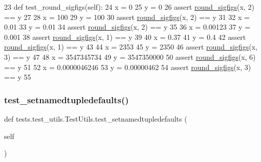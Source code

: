 \begin{DoxyCode}
23     \textcolor{keyword}{def }test\_round\_sigfigs(self):
24         x = 0
25         y = 0
26         \textcolor{keyword}{assert} \hyperlink{namespaceparlai_1_1agents_1_1legacy__agents_1_1seq2seq_1_1utils__v0_af377ec61bfc0423461e7b409ffc883b9}{round\_sigfigs}(x, 2) == y
27 
28         x = 100
29         y = 100
30         \textcolor{keyword}{assert} \hyperlink{namespaceparlai_1_1agents_1_1legacy__agents_1_1seq2seq_1_1utils__v0_af377ec61bfc0423461e7b409ffc883b9}{round\_sigfigs}(x, 2) == y
31 
32         x = 0.01
33         y = 0.01
34         \textcolor{keyword}{assert} \hyperlink{namespaceparlai_1_1agents_1_1legacy__agents_1_1seq2seq_1_1utils__v0_af377ec61bfc0423461e7b409ffc883b9}{round\_sigfigs}(x, 2) == y
35 
36         x = 0.00123
37         y = 0.001
38         \textcolor{keyword}{assert} \hyperlink{namespaceparlai_1_1agents_1_1legacy__agents_1_1seq2seq_1_1utils__v0_af377ec61bfc0423461e7b409ffc883b9}{round\_sigfigs}(x, 1) == y
39 
40         x = 0.37
41         y = 0.4
42         \textcolor{keyword}{assert} \hyperlink{namespaceparlai_1_1agents_1_1legacy__agents_1_1seq2seq_1_1utils__v0_af377ec61bfc0423461e7b409ffc883b9}{round\_sigfigs}(x, 1) == y
43 
44         x = 2353
45         y = 2350
46         \textcolor{keyword}{assert} \hyperlink{namespaceparlai_1_1agents_1_1legacy__agents_1_1seq2seq_1_1utils__v0_af377ec61bfc0423461e7b409ffc883b9}{round\_sigfigs}(x, 3) == y
47 
48         x = 3547345734
49         y = 3547350000
50         \textcolor{keyword}{assert} \hyperlink{namespaceparlai_1_1agents_1_1legacy__agents_1_1seq2seq_1_1utils__v0_af377ec61bfc0423461e7b409ffc883b9}{round\_sigfigs}(x, 6) == y
51 
52         x = 0.0000046246
53         y = 0.00000462
54         \textcolor{keyword}{assert} \hyperlink{namespaceparlai_1_1agents_1_1legacy__agents_1_1seq2seq_1_1utils__v0_af377ec61bfc0423461e7b409ffc883b9}{round\_sigfigs}(x, 3) == y
55 
\end{DoxyCode}
\mbox{\label{classtests_1_1test__utils_1_1TestUtils_a211bff449c261cce734e51e3a937d1af}} 
\subsubsection{\texorpdfstring{test\+\_\+setnamedtupledefaults()}{test\_setnamedtupledefaults()}}
{\footnotesize\ttfamily def tests.\+test\+\_\+utils.\+Test\+Utils.\+test\+\_\+setnamedtupledefaults (\begin{DoxyParamCaption}\item[{}]{self }\end{DoxyParamCaption})}



